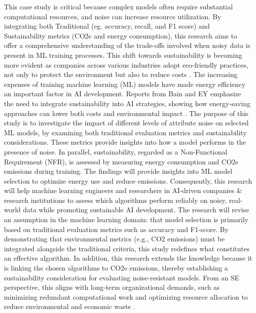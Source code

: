 \documentclass[conference]{IEEEtran}
\begin{document}
This case study is critical because complex models often require substantial computational resources, and noise can increase resource utilization. By integrating both Traditional (eg. accuracy, recall, and F1 score) and Sustainability metrics (CO2e and energy consumption), this research aims to offer a comprehensive understanding of the trade-offs involved when noisy data is present in ML training processes. This shift towards sustainability is becoming more evident as companies across various industries adopt eco-friendly practices, not only to protect the environment but also to reduce costs \cite{ey_ai_sustainability}. The increasing expenses of training machine learning (ML) models have made energy efficiency an important factor in AI development. Reports from Bain and EY emphasize the need to integrate sustainability into AI strategies, showing how energy-saving approaches can lower both costs and environmental impact \cite{bain_ai_sustainability}. 
\newline
\newline
The purpose of this study is to investigate the impact of different levels of attribute noise on selected ML models, by examining both traditional evaluation metrics and sustainability considerations. These metrics provide insights into how a model performs in the presence of noise. In parallel, sustainability, regarded as a Non-Functional Requirement (NFR), is assessed by measuring energy consumption and CO2e emissions during training.
\newline
\newline
The findings will provide insights into ML model selection to optimize energy use and reduce emissions. Consequently, this research will help machine learning engineers and researchers in AI-driven companies \& research institutions to assess which algorithms perform reliably on noisy, real-world data while promoting sustainable AI development.
\newline
\newline
The research will revise an assumption in the machine learning domain: that model selection is primarily based on traditional evaluation metrics such as accuracy and F1-score.  By demonstrating that environmental metrics (e.g., CO2 emissions) must be integrated alongside the traditional criteria, this study redefines what constitutes an effective algorithm. In addition, this research extends the knowledge because it is linking the chosen algorithms to CO2e emissions, thereby establishing a sustainability consideration for evaluating noise-resistant models. From an SE perspective, this aligns with long-term organizational demands, such as minimizing redundant computational work and optimizing resource allocation to reduce environmental and economic waste \cite[pp. 290-291]{sweb}.
\end{document}
